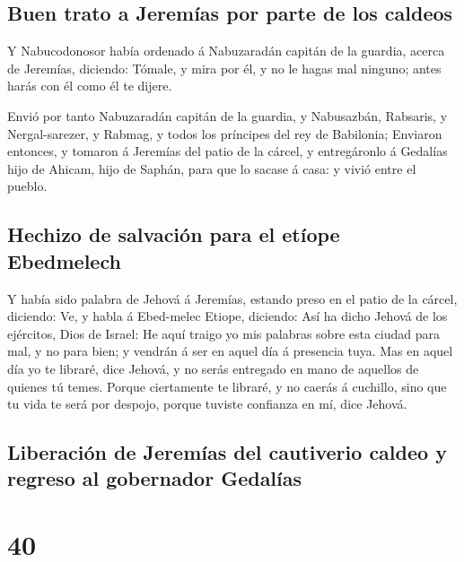 \hypertarget{buen-trato-a-jeremuxedas-por-parte-de-los-caldeos}{%
\subsection{Buen trato a Jeremías por parte de los
caldeos}\label{buen-trato-a-jeremuxedas-por-parte-de-los-caldeos}}

 Y Nabucodonosor había ordenado á Nabuzaradán capitán de la
guardia, acerca de Jeremías, diciendo:  Tómale, y mira por
él, y no le hagas mal ninguno; antes harás con él como él te dijere.

 Envió por tanto Nabuzaradán capitán de la guardia, y
Nabusazbán, Rabsaris, y Nergal-sarezer, y Rabmag, y todos los príncipes
del rey de Babilonia;  Enviaron entonces, y tomaron á
Jeremías del patio de la cárcel, y entregáronlo á Gedalías hijo de
Ahicam, hijo de Saphán, para que lo sacase á casa: y vivió entre el
pueblo.

\hypertarget{hechizo-de-salvaciuxf3n-para-el-etuxedope-ebedmelech}{%
\subsection{Hechizo de salvación para el etíope
Ebedmelech}\label{hechizo-de-salvaciuxf3n-para-el-etuxedope-ebedmelech}}

 Y había sido palabra de Jehová á Jeremías, estando preso
en el patio de la cárcel, diciendo:  Ve, y habla á
Ebed-melec Etiope, diciendo: Así ha dicho Jehová de los ejércitos, Dios
de Israel: He aquí traigo yo mis palabras sobre esta ciudad para mal, y
no para bien; y vendrán á ser en aquel día á presencia tuya.
 Mas en aquel día yo te libraré, dice Jehová, y no serás
entregado en mano de aquellos de quienes tú temes.  Porque
ciertamente te libraré, y no caerás á cuchillo, sino que tu vida te será
por despojo, porque tuviste confianza en mí, dice Jehová.

\hypertarget{liberaciuxf3n-de-jeremuxedas-del-cautiverio-caldeo-y-regreso-al-gobernador-gedaluxedas}{%
\subsection{Liberación de Jeremías del cautiverio caldeo y regreso al
gobernador
Gedalías}\label{liberaciuxf3n-de-jeremuxedas-del-cautiverio-caldeo-y-regreso-al-gobernador-gedaluxedas}}

\hypertarget{section-39}{%
\section{40}\label{section-39}}

